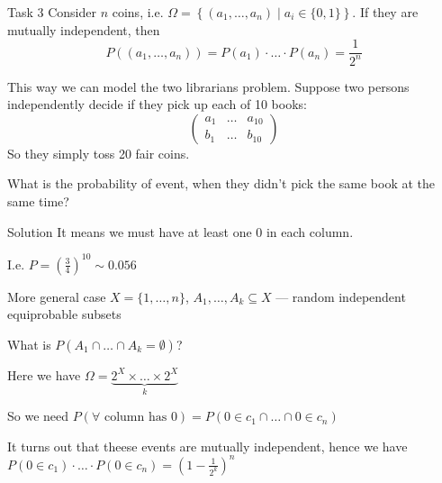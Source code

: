 \documentclass[fullscreen=true, bookmarks=true, hyperref={pdfencoding=unicode}]{beamer}
\begin{document}
\begin{frame}{Task 3}
  Consider $n$ coins, i.e. 
  $\Omega = \left\{(a_1, \dots, a_n) \mid a_i \in \{0, 1\}\right\}$. 
  If they are mutually independent, then
  $$P((a_1, \dots, a_n)) = P(a_1)\cdot \ldots \cdot P(a_n) = \frac{1}{2^n}$$

  \pause 
  This way we can model the two librarians problem. 
  Suppose two persons independently decide if they pick up each of 10 books:
  $$ \begin{pmatrix}
    a_1 & \dots & a_{10} \\
    b_1 & \dots & b_{10}
  \end{pmatrix}$$
  So they simply toss 20 fair coins. 
  
  What is the probability of event, 
  when they didn't pick the same book at the same time?
\end{frame}


\begin{frame}

  \begin{block}{Solution}
    \pause
    It means we must have at least one $0$ in each column.
  
    \pause
    I.e. $P = \left(\frac{3}{4}\right)^{10} \sim 0.056$    
  \end{block}

  \pause
  \begin{block}{More general case}
    $X = \{1, \dots, n\}$, $A_1, \dots, A_k \subseteq X$ — random independent equiprobable subsets

    What is $P(A_1 \cap \dots \cap A_k = \emptyset)$?
  \end{block}

  \pause
  Here we have $\Omega = \underset{k}{\underbrace{2^X \times \dots \times 2^X}}$

  So we need $P(\forall \text{ column has } 0) = P(0 \in c_1 \cap \dots \cap 0 \in c_n)$

  It turns out that theese events are mutually independent, hence we have
  $P(0 \in c_1) \cdot \ldots \cdot P(0 \in c_n) = (1 - \frac{1}{2^k})^n$
\end{frame}
\end{document}
